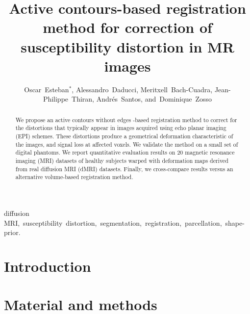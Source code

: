 \documentclass{llncs}
\title{Active contours-based registration method for correction of susceptibility distortion in MR images}
\author{Oscar~Esteban$^{*}$,
        Alessandro~Daducci,
        Meritxell~Bach-Cuadra,
        Jean-Philippe~Thiran,
        Andr\'es~Santos,
        and~Dominique~Zosso%
}
\begin{document}
\maketitle

\begin{abstract}
We propose an active contours without edges \mbox{-based} registration method
  to correct for the distortions that typically appear in
  images acquired using echo planar imaging (EPI) schemes.
These distortions produce a geometrical deformation characteristic of the images,
  and signal loss at affected voxels.
We validate the method on a small set of digital phantoms.
We report quantitative evaluation results on 20 magnetic resonance imaging (MRI) 
  datasets of healthy subjects warped with deformation maps derived from real 
  diffusion MRI (dMRI) datasets.
Finally, we cross-compare results versus an alternative volume-based registration
  method.
\end{abstract}

\begin{keywords}
diffusion MRI,~susceptibility~distortion,~segmentation,~registration,~parcellation,~shape-prior.
\end{keywords}

\section{Introduction}\label{sec:intro}

\section{Material and methods}\label{sec:methods}




\end{document}
